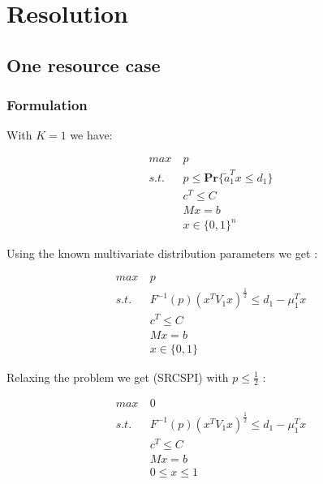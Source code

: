 \documentclass{beamer}
\begin{document}
\section{Resolution}
\subsection{One resource case}
\subsubsection{Formulation}
\begin{frame}

With $K=1$ we have:

\begin{align*}
 max\ & p\\
 s.t.\ & p \leq \mathbf{Pr} \{ \tilde{a}_1^Tx \leq d_1 \} \\
 & c^T \leq C \\
 & Mx = b \\
 & x \in \{0, 1\}^n
\end{align*}

\end{frame}

\begin{frame}
Using the known multivariate distribution parameters we get :

\begin{align*}
 max\ & p\\
 s.t.\ & F^{-1}(p)(x^TV_1x)^{\frac{1}{2}} \leq d_1 - \mu_1^Tx \\
 & c^T \leq C \\
 & Mx = b \\
 & x \in \{0,1\}
\end{align*}
\end{frame}

\begin{frame}
Relaxing the problem we get (SRCSPI) with $p \leq \frac{1}{2}$ :

\begin{align*}
 max\ & 0\\
 s.t.\ & F^{-1}(p)(x^TV_1x)^{\frac{1}{2}} \leq d_1 - \mu_1^Tx \\
 & c^T \leq C \\
 & Mx = b \\
 & 0 \leq x \leq 1
\end{align*}
\end{frame}
\end{document}
